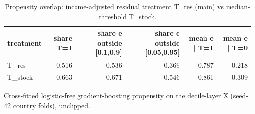 \begin{table}[htbp]
\centering
\caption{Propensity overlap: income-adjusted residual treatment T\_res (main) vs median-threshold T\_stock.}
\label{tab:overlap}
\begin{tabular}{lrrrrr}
\toprule
treatment & share T=1 & share e outside [0.1,0.9] & share e outside [0.05,0.95] & mean e | T=1 & mean e | T=0 \\
\midrule
T\_res & 0.516 & 0.536 & 0.369 & 0.787 & 0.218 \\
T\_stock & 0.663 & 0.671 & 0.546 & 0.861 & 0.309 \\
\bottomrule
\end{tabular}
\par\smallskip\footnotesize Cross-fitted logistic-free gradient-boosting propensity on the decile-layer X (seed-42 country folds), unclipped.
\end{table}
